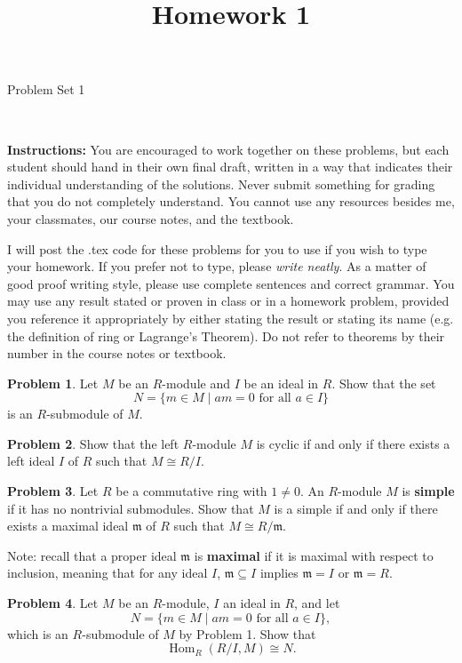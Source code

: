 \documentclass[11pt]{article}
\title{}
\date{\vspace{-0.5in}}
\title{Homework 1}
\DeclareMathOperator{\Hom}{Hom}
\newcommand{\m}{\mathfrak{m}}
\theoremstyle{definition}
\newtheorem{problem}{Problem}
\begin{document}
\thispagestyle{fancy}
\pagestyle{fancy}

\vspace{3em}

\begin{center}
	{\LARGE Problem Set 1}
\end{center}

\

\noindent
{\bf Instructions:}
You are encouraged to work together on these problems, but each student should hand in their own final draft, written in a way that indicates their individual understanding of the solutions. Never submit something for grading that you do not completely understand. You cannot use any resources besides me, your classmates, our course notes, and the textbook.


I will post the .tex code for these problems for you to use if you wish to type your homework. If you prefer not to type, please  {\em write neatly}. As a matter of good proof writing style, please use complete sentences and correct grammar. You may use any result  stated or proven in class or in a homework problem, provided you reference it appropriately by either stating the result or stating its name (e.g. the definition of ring or Lagrange's Theorem). Do not refer to theorems by their number in the course notes or textbook.


\vspace{2em}




\begin{problem}
Let $M$ be an $R$-module and $I$ be an ideal in $R$. Show that the set
$$N = \{ m \in M \mid am = 0 \textrm{ for all } a \in I \}$$
is an $R$-submodule of $M$.
\end{problem}




\begin{problem}
Show that the left $R$-module $M$ is cyclic if and only if there exists a left ideal $I$ of $R$ such that $M \cong R/I$.
\end{problem}


\begin{problem}
Let $R$ be a commutative ring with $1 \neq 0$. An $R$-module $M$ is {\bf simple} if it has no nontrivial submodules.
Show that $M$ is a simple if and only if there exists a maximal ideal $\m$ of $R$ such that $M \cong R/\m$.

\noindent
Note: recall that a proper ideal $\m$ is {\bf maximal} if it is maximal with respect to inclusion, meaning that for any ideal $I$, $\m \subseteq I$ implies $\m = I$ or $\m = R$.
\end{problem}


\begin{problem}
Let $M$ be an $R$-module, $I$ an ideal in $R$, and let
$$N = \{ m \in M \mid am = 0 \textrm{ for all } a \in I \},$$
which is an $R$-submodule of $M$ by Problem 1. Show that
$$\Hom_R(R/I,M) \cong N.$$
\end{problem}
\end{document}
